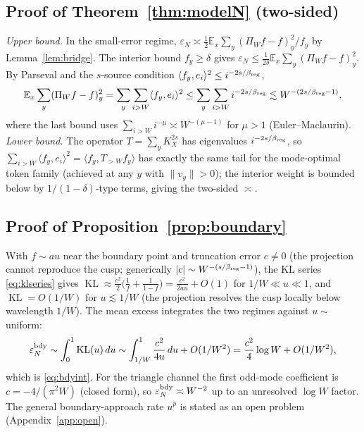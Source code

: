 \documentclass[12pt]{article}
\newcommand{\eps}{\varepsilon}
\newcommand{\KL}{\operatorname{KL}}
\newcommand{\E}{\mathbb{E}}
\newcommand{\PiW}{\Pi_{W}}
\theoremstyle{remark}
\begin{document}
\subsection{Proof of Theorem~\ref{thm:modelN} (two-sided)}
\label{app:modelN}
\textit{Upper bound.} In the small-error regime,
$\eps_N\asymp\frac12\E_x\sum_y(\PiW f-f)_y^2/f_y$ by
Lemma~\ref{lem:bridge}. The interior bound $f_y\ge\delta$ gives
$\eps_N\le\frac1{2\delta}\E_x\sum_y(\PiW f-f)_y^2$. By Parseval and the
$s$-source condition $\langle f_y,e_i\rangle^2\le i^{-2s/\beta_{\rm reg}}$,
\begin{equation*}
  \E_x\sum_y(\PiW f-f)_y^2
  = \sum_y\sum_{i>W}\langle f_y,e_i\rangle^2
  \le \sum_y\sum_{i>W}i^{-2s/\beta_{\rm reg}}
  \lesssim W^{-(2s/\beta_{\rm reg}-1)},
\end{equation*}
where the last bound uses $\sum_{i>W}i^{-\mu}\asymp W^{-(\mu-1)}$ for
$\mu>1$ (Euler--Maclaurin). \textit{Lower bound.} The operator
$T=\sum_y K_X^{2s}$ has eigenvalues $i^{-2s/\beta_{\rm reg}}$, so
$\sum_{i>W}\langle f_y,e_i\rangle^2=\langle f_y,T_{>W}f_y\rangle$ has exactly
the same tail for the mode-optimal token family (achieved at any $y$ with
$\|v_y\|>0$); the interior weight is bounded below by $1/(1-\delta)$-type
terms, giving the two-sided $\asymp$.

\subsection{Proof of Proposition~\ref{prop:boundary}}
\label{app:boundary}
With $f\sim au$ near the boundary point and truncation error $c\ne0$ (the
projection cannot reproduce the cusp; generically $|c|\sim
W^{-(s/\beta_{\rm reg}-1)}$), the KL series \eqref{eq:klseries} gives
$\KL\approx\frac{c^2}{2}\bigl(\frac1f+\frac1{1-f}\bigr)=\frac{c^2}{2au}+O(1)$
for $1/W\ll u\ll1$, and $\KL=O(1/W)$ for $u\lesssim 1/W$ (the projection
resolves the cusp locally below wavelength $1/W$). The mean excess integrates
the two regimes against $u\sim$ uniform:
\begin{equation*}
  \eps_N^{\rm bdy}
  \sim \int_{0}^{1}\KL(u)\,du
  \sim \int_{1/W}^{1}\frac{c^2}{4u}\,du + O(1/W^2)
  = \frac{c^2}{4}\log W + O(1/W^2),
\end{equation*}
which is \eqref{eq:bdyint}. For the triangle channel the first odd-mode
coefficient is $c=-4/(\pi^2 W)$ (closed form), so
$\eps_N^{\rm bdy}\asymp W^{-2}$ up to an unresolved $\log W$ factor. The
general boundary-approach rate $u^p$ is stated as an open problem
(Appendix~\ref{app:open}).
\end{document}
